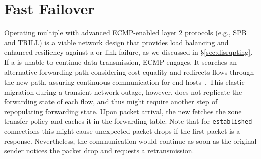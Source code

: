 \section{Fast Failover}
\label{sec:ecmp}
Operating multiple \tps with advanced ECMP-enabled layer 2 protocols (e.g., SPB and
TRILL) is a viable network design that provides load balancing and enhanced resiliency
against a \tp or link failure, as we discussed in \S\ref{sec:disrupting}.
If a \tp is unable to continue data transmission, ECMP engages. It searches an alternative
forwarding path considering cost equality and redirects flows through the new path, assuring
continuous communication for end hosts~\cite{rfc6754}.
This elastic migration during a transient network outage, however, does not replicate the
forwarding state of each flow, and thus might require another step of repopulating
forwarding state. Upon packet arrival, the new \tp fetches the zone transfer policy
and caches it in the forwarding table. Note that for \texttt{established} connections this might
cause unexpected packet drops if the first packet is a response. Nevertheless, the
communication would continue as soon as the original sender notices the packet drop
and requests a retransmission.









